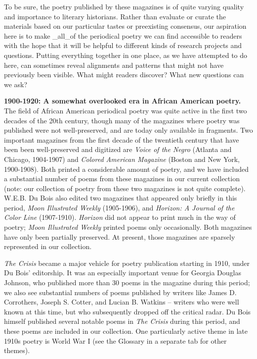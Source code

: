 \documentclass[
  letterpaper,
  DIV=11,
  numbers=noendperiod]{scrartcl}
\begin{document}
To be sure, the poetry published by these magazines is of quite varying
quality and importance to literary historians. Rather than evaluate or
curate the materials based on our particular tastes or preexisting
consensus, our aspiration here is to make \_all\_of the periodical
poetry we can find accessible to readers with the hope that it will be
helpful to different kinds of research projects and questions. Putting
everything together in one place, as we have attempted to do here, can
sometimes reveal alignments and patterns that might not have previously
been visible. What might readers discover? What new questions can we
ask?

\textbf{1900-1920: A somewhat overlooked era in African American
poetry.} The field of African American periodical poetry was quite
active in the first two decades of the 20th century, though many of the
magazines where poetry was published were not well-preserved, and are
today only available in fragments. Two important magazines from the
first decade of the twentieth century that have been been well-preserved
and digitized are \emph{Voice of the Negro} (Atlanta and Chicago,
1904-1907) and \emph{Colored American Magazine} (Boston and New York,
1900-1908). Both printed a considerable amount of poetry, and we have
included a substantial number of poems from these magazines in our
current collection (note: our collection of poetry from these two
magazines is not quite complete). W.E.B. Du Bois also edited two
magazines that appeared only briefly in this period, \emph{Moon
Illustrated Weekly} (1905-1906), and \emph{Horizon: A Journal of the
Color Line} (1907-1910). \emph{Horizon} did not appear to print much in
the way of poetry; \emph{Moon Illustrated Weekly} printed poems only
occasionally. Both magazines have only been partially preserved. At
present, those magazines are sparsely represented in our collection.

\emph{The Crisis} became a major vehicle for poetry publication starting
in 1910, under Du Bois' editorship. It was an especially important venue
for Georgia Douglas Johnson, who published more than 30 poems in the
magazine during this period; we also see substantial numbers of poems
published by writers like James D. Corrothers, Joseph S. Cotter, and
Lucian B. Watkins -- writers who were well known at this time, but who
subsequently dropped off the critical radar. Du Bois himself published
several notable poems in \emph{The Crisis} during this period, and these
poems are included in our collection. One particularly active theme in
late 1910s poetry is World War I (see the Glossary in a separate tab for
other themes).
\end{document}
